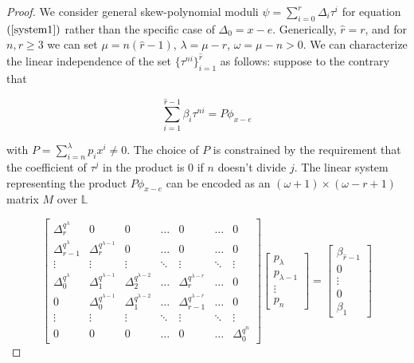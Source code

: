 \documentclass[sigconf]{acmart}
\renewcommand{\L}{\mathbb{L}}
\newcommand{\hatr}{\hat{r}}
\newcommand{\reduc}{\lambda}
\begin{document}
\begin{proof}
We consider general skew-polynomial moduli $\psi = \sum_{i=0}^{r} \Delta_i \tau^i$ for equation $(\ref{system1})$ rather than the specific case of $\Delta_0 = x - e$. Generically, $\hatr = r$, and for $n,r \geq 3$ we can set $\mu = n(\hatr - 1)$, $\reduc = \mu - r$, $\omega = \mu - n > 0$. We can characterize the linear independence of the set $\{\tau^{ni} \}_{i =1}^{\hatr}$ as follows: suppose to the contrary that

\begin{equation}\label{mult}
    \sum_{i=1}^{\hatr - 1} \beta_i \tau^{ni} = P \phi_{x - e}
\end{equation}

with $P = \sum_{i= n}^{\reduc} p_ix^i \neq 0$. The choice of $P$ is constrained by the requirement that the coefficient of $\tau^{j}$ in the product is 0 if $n$ doesn't divide $j$. The linear system representing the product $P\phi_{x-e}$ can be encoded as an $ (\omega + 1) \times (\omega - r + 1)$ matrix $M$ over $\L$

\begin{equation}
    \label{productsystem}
    \begin{bmatrix}
    \Delta_{r}^{q^{\reduc}} & 0 & 0 & \ldots & 0 & \ldots & 0 \\
    \Delta_{r - 1}^{q^{\reduc}} & \Delta_{r}^{q^{\reduc - 1}} & 0 & \ldots & 0 & \ldots & 0 \\
    \vdots & \vdots & \vdots & \ddots & \vdots & \ddots & \vdots \\
    \Delta_{0}^{q^{\reduc}} & \Delta_{1}^{q^{\reduc - 1}} & \Delta_{2}^{q^{\reduc - 2}} & \ldots & \Delta_{r}^{q^{\reduc - r}} & \ldots & 0 \\
    0 & \Delta_{0}^{q^{\reduc - 1}} & \Delta_{1}^{q^{\reduc - 2}} & \ldots & \Delta_{r-1}^{q^{\lambda - r}} & \ldots & 0 \\
    \vdots & \vdots & \vdots & \ddots & \vdots & \ddots & \vdots \\
    0 & 0 & 0 & \ldots & 0 & \ldots & \Delta_0^{q^{n}}
    
    
    \end{bmatrix}
    \begin{bmatrix}
    p_{\reduc} \\ p_{\reduc - 1} \\ \vdots \\ p_{n}
    \end{bmatrix}
    = 
    \begin{bmatrix}
    \beta_{\hatr-1} \\ 0 \\ \vdots \\ 0 \\ \beta_{1}
    \end{bmatrix}
\end{equation}


\end{proof}
\end{document}
